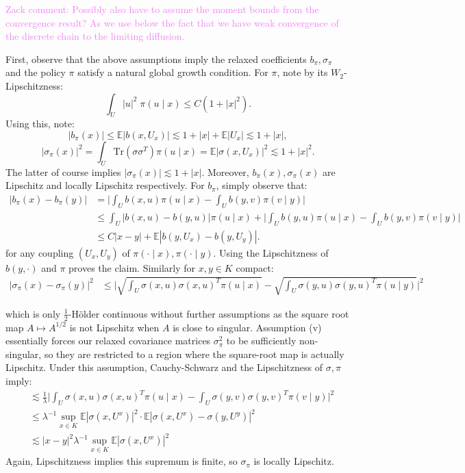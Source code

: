 \documentclass[11pt,oneside,reqno]{article}
\theoremstyle{plain}
\theoremstyle{definition}
\numberwithin{equation}{section}
\renewcommand{\leq}{\leqslant}
\newcommand{\E}{\mathbb{E}}
\newcommand{\zack}[1]{\textcolor{Violet}{Zack comment: #1}}
\begin{document}
\zack{Possibly also have to assume the moment bounds from the convergence result? As we use below the fact that we have weak convergence of the discrete chain to the limiting diffusion.}

First, observe that the above assumptions imply the relaxed coefficients $b_\pi, \sigma_\pi$ and the policy $\pi$ satisfy a natural
global growth condition. For $\pi$, note by its $W_2$-Lipschitzness:
%
\[\int_U |u|^2 \; \pi(u \mid x) \leq C(1 + |x|^2).\]	
%
\noindent Using this, note:
%
\[|b_\pi(x)| \leq \E |b(x, U_x)| \lesssim 1 + |x| + \E |U_x| \lesssim 1 + |x|,\]
\[|\sigma_\pi(x)|^2 = \int_U \mathrm{Tr}(\sigma \sigma^T) \pi(u \mid x) = \E | \sigma(x, U_x)|^2 \lesssim 1 + |x|^2.\]
%
\noindent The latter of course implies $|\sigma_\pi(x)| \lesssim 1 + |x|$. Moreover, $b_\pi(x), \sigma_\pi(x)$ are Lipschitz and locally Lipschitz respectively. For $b_\pi$, simply observe that:
 \begin{align*}
	\Big|b_\pi(x) - b_\pi(y)\Big| & = \bigg|\int_U b(x,u) \pi(u \mid x) - \int_U b(y,v) \pi(v \mid y) \bigg|\\
	& \leq \int_U |b(x,u) - b(y,u)| \pi(u \mid x) + \bigg|\int_U b(y,u) \pi(u \mid x) - \int_U b(y,v) \pi(v \mid y) \bigg|\\
	& \leq C |x-y| + \E |b(y, U_x) - b(y, U_y)|. 
\end{align*}
 \noindent for any coupling $(U_x, U_y)$ of $\pi(\cdot \mid x), \pi(\cdot \mid y)$. Using the Lipschitzness of
  $b(y, \cdot)$ and $\pi$ proves the claim. Similarly for $x,y \in K$ compact:
	\begin{align*}
		\Big| \sigma_\pi(x) - \sigma_\pi(y) \Big|^2 & \leq \bigg|\sqrt{\int_U \sigma(x,u)\sigma(x,u)^T \pi(u \mid x)} - \sqrt{\int_U \sigma(y,u)\sigma(y,u)^T \pi(u \mid y)} \bigg|^2
	\end{align*}

	\noindent which is only $\frac{1}{2}$-H\"older continuous without further assumptions as the square root map $A \mapsto A^{1/2}$ is not Lipschitz when $A$ is close to singular. Assumption (v) essentially 
	forces our relaxed covariance matrices $\sigma_\pi^2$ to be sufficiently non-singular, so they are restricted to a region where the square-root map is actually Lipschitz. Under this assumption, Cauchy-Schwarz and the Lipschitzness of $\sigma, \pi$ imply:
	\begin{align*}
		& \lesssim \frac{1}{\lambda} \bigg| \int_U \sigma(x,u)\sigma(x,u)^T \pi(u \mid x) - \int_U \sigma(y,v)\sigma(y,v)^T \pi(v \mid y) \bigg|^2 \\
		& \leq \lambda^{-1}\sup_{x \in K} \E |\sigma(x, U^x)|^2 \cdot \E |\sigma(x, U^x) - \sigma(y, U^y)|^2\\
		& \lesssim |x-y|^2 \lambda^{-1}\sup_{x \in K} \E |\sigma(x, U^x)|^2
	\end{align*}
	\noindent Again, Lipschitzness implies this supremum is finite, so $\sigma_\pi$ is locally Lipschitz.
	
\end{document}
